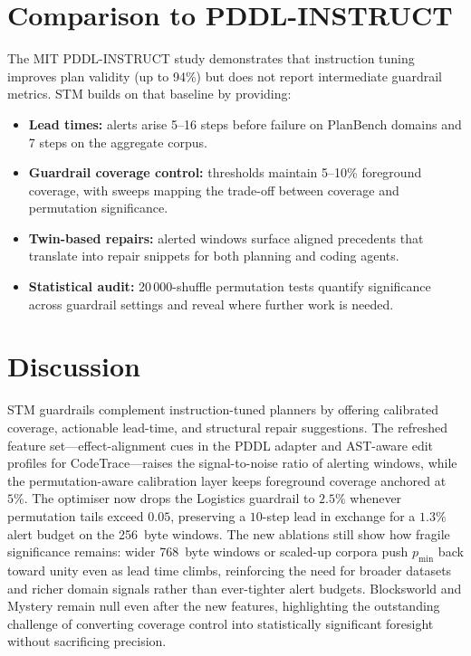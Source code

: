 \documentclass[11pt]{article}
\begin{document}
\section{Comparison to PDDL-INSTRUCT}
The MIT PDDL-INSTRUCT study \cite{verma2025pddlinstruct} demonstrates that
instruction tuning improves plan validity (up to 94\%) but does not report
intermediate guardrail metrics. STM builds on that baseline by providing:
\begin{itemize}
  \item \textbf{Lead times:} alerts arise 5--16 steps before failure on PlanBench
  domains and 7 steps on the aggregate corpus.
  \item \textbf{Guardrail coverage control:} thresholds maintain 5--10\% foreground
  coverage, with sweeps mapping the trade-off between coverage and permutation
  significance.
  \item \textbf{Twin-based repairs:} alerted windows surface aligned precedents
  that translate into repair snippets for both planning and coding agents.
  \item \textbf{Statistical audit:} 20\,000-shuffle permutation tests quantify
  significance across guardrail settings and reveal where further work is needed.
\end{itemize}

\section{Discussion}
STM guardrails complement instruction-tuned planners by offering calibrated
coverage, actionable lead-time, and structural repair suggestions. The refreshed
feature set---effect-alignment cues in the PDDL adapter and AST-aware edit
profiles for CodeTrace---raises the signal-to-noise ratio of alerting windows,
while the permutation-aware calibration layer keeps foreground coverage anchored
at $5\%$. The optimiser now drops the Logistics guardrail to $2.5\%$ whenever
permutation tails exceed $0.05$, preserving a $10$-step lead in exchange for a
$1.3\%$ alert budget on the 256~byte windows. The new ablations still show how
fragile significance remains: wider 768~byte windows or scaled-up corpora push
$p_{\min}$ back toward unity even as lead time climbs, reinforcing the need for
broader datasets and richer domain signals rather than ever-tighter alert
budgets. Blocksworld and Mystery remain null even after the new features,
highlighting the outstanding challenge of converting coverage control into
statistically significant foresight without sacrificing precision.
\end{document}
